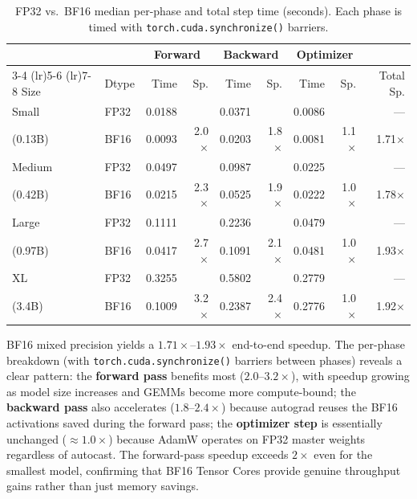 \documentclass[11pt]{article}
\begin{document}
\begin{table}[h]
\centering
\caption{FP32 vs.\ BF16 median per-phase and total step time (seconds).
  Each phase is timed with \texttt{torch.cuda.synchronize()} barriers.}
\label{tab:mixed-precision}
\begin{tabular}{ll rr rr rr r}
\toprule
 & & \multicolumn{2}{c}{Forward} & \multicolumn{2}{c}{Backward} & \multicolumn{2}{c}{Optimizer} & \\
\cmidrule(lr){3-4} \cmidrule(lr){5-6} \cmidrule(lr){7-8}
Size & Dtype & Time & Sp. & Time & Sp. & Time & Sp. & Total Sp. \\
\midrule
Small  & FP32 & 0.0188 &       & 0.0371 &       & 0.0086 &       & --- \\
(0.13B)& BF16 & 0.0093 & 2.0$\times$ & 0.0203 & 1.8$\times$ & 0.0081 & 1.1$\times$ & 1.71$\times$ \\
\midrule
Medium & FP32 & 0.0497 &       & 0.0987 &       & 0.0225 &       & --- \\
(0.42B)& BF16 & 0.0215 & 2.3$\times$ & 0.0525 & 1.9$\times$ & 0.0222 & 1.0$\times$ & 1.78$\times$ \\
\midrule
Large  & FP32 & 0.1111 &       & 0.2236 &       & 0.0479 &       & --- \\
(0.97B)& BF16 & 0.0417 & 2.7$\times$ & 0.1091 & 2.1$\times$ & 0.0481 & 1.0$\times$ & 1.93$\times$ \\
\midrule
XL     & FP32 & 0.3255 &       & 0.5802 &       & 0.2779 &       & --- \\
(3.4B) & BF16 & 0.1009 & 3.2$\times$ & 0.2387 & 2.4$\times$ & 0.2776 & 1.0$\times$ & 1.92$\times$ \\
\bottomrule
\end{tabular}
\end{table}

BF16 mixed precision yields a $1.71\times$--$1.93\times$ end-to-end speedup.
The per-phase breakdown (with \texttt{torch.cuda.synchronize()} barriers
between phases) reveals a clear pattern:
the \textbf{forward pass} benefits most ($2.0$--$3.2\times$), with speedup
growing as model size increases and GEMMs become more compute-bound;
the \textbf{backward pass} also accelerates ($1.8$--$2.4\times$) because
autograd reuses the BF16 activations saved during the forward pass;
the \textbf{optimizer step} is essentially unchanged ($\approx1.0\times$)
because AdamW operates on FP32 master weights regardless of autocast.
The forward-pass speedup exceeds $2\times$ even for the smallest model,
confirming that BF16 Tensor Cores provide genuine throughput gains rather
than just memory savings.
\end{document}
